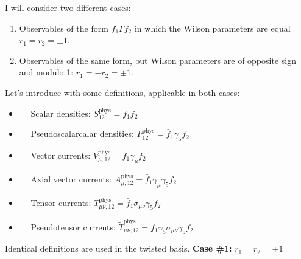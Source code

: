 \documentclass[english, LaM, oneside, noexaminfo]{sapthesis}
\begin{document}
I will consider two different cases:
\begin{enumerate}
    \item Observables of the form $\bar f_1 \Gamma f_2$ in which the Wilson parameters are equal $r_1 = r_2 = \pm 1$.
    \item Observables of the same form, but Wilson parameters are of opposite sign and modulo 1: $r_1 = -r_2 = \pm 1$.
\end{enumerate}
Let's introduce with some definitions, applicable in both cases:
\begin{itemize}
    \item [] $\quad$ Scalar densities: \hspace*{5mm} $S_{12}^\text{phys} = \bar f_1 f_2$
    \item [] $\quad$ Pseudoscalarcalar densities: \hspace*{5mm} $P^{\text{phys}}_{12} = \bar f_1 \gamma_5 f_2$
    \item [] $\quad$ Vector currents: \hspace*{5mm} $V_{\mu,12}^{\text{phys}} = \bar f_1 \gamma_\mu f_2$
    \item [] $\quad$ Axial vector currents: \hspace*{5mm} $A_{\mu,12}^{\text{phys}} = \bar f_1 \gamma_\mu \gamma_5 f_2$
    \item [] $\quad$ Tensor currents: \hspace*{5mm} $T_{\mu\nu,12}^{\text{phys}} = \bar f_1 \sigma_{\mu\nu} \gamma_5 f_2$
    \item [] $\quad$ Pseudotensor currents: \hspace*{5mm} $\tilde{T}_{\mu\nu,12}^{\text{phys}} = \bar f_1 \gamma_5\sigma_{\mu\nu} \gamma_5 f_2$
\end{itemize}
Identical definitions are used in the twisted basis.
\newline
\newline
{\bf Case \#1: } $r_1 = r_2 = \pm 1$
\end{document}
